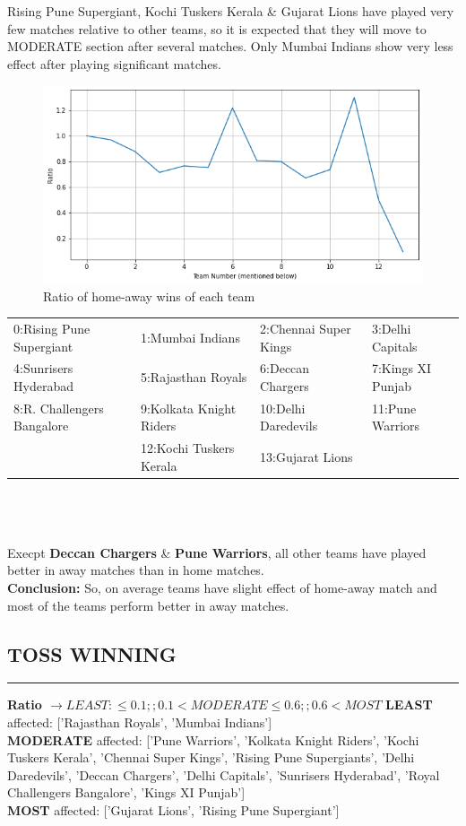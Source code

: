 \documentclass[12pt]{article}
\begin{document}
Rising Pune Supergiant, Kochi Tuskers Kerala \& Gujarat Lions have played very few matches relative to other teams, so it is expected that they will move to MODERATE section after several matches.
Only Mumbai Indians show very less effect after playing significant matches.


\begin{figure}
	\centering
	\includegraphics[width=0.7\linewidth]{home_away}
	\caption{Ratio of home-away wins of each team}
	\label{fig:homeaway}
\end{figure}


{\fontsize{10}{12}\selectfont \begin{tabular}{l | l | l | l}
		0:Rising Pune Supergiant & 1:Mumbai Indians & 2:Chennai Super Kings & 3:Delhi Capitals\\
		4:Sunrisers Hyderabad & 5:Rajasthan Royals & 6:Deccan Chargers & 7:Kings XI Punjab\\
		8:R. Challengers Bangalore & 9:Kolkata Knight Riders & 10:Delhi Daredevils & 11:Pune Warriors\\
		& 12:Kochi Tuskers Kerala & 13:Gujarat Lions & \\
\end{tabular}}
\\\\\\
Execpt \textbf{Deccan Chargers} \& \textbf{Pune Warriors}, all other teams have played better in away matches than in home matches.\\

\textbf{Conclusion:} So, on average teams have slight effect of home-away match and most of the teams perform better in away matches.

\subsection*{TOSS WINNING}
\hrule
\vspace*{15pt}
\textbf{Ratio $\rightarrow LEAST: \leq 0.1 ;;  0.1 < MODERATE \leq 0.6 ;;  0.6 < MOST$}
\textbf{LEAST} affected:  ['Rajasthan Royals', 'Mumbai Indians']\\
\textbf{MODERATE} affected:  ['Pune Warriors', 'Kolkata Knight Riders', 'Kochi Tuskers Kerala', 'Chennai Super Kings', 'Rising Pune Supergiants', 'Delhi Daredevils', 'Deccan Chargers', 'Delhi Capitals', 'Sunrisers Hyderabad', 'Royal Challengers Bangalore', 'Kings XI Punjab']\\
\textbf{MOST} affected:  ['Gujarat Lions', 'Rising Pune Supergiant']\\
\end{document}

